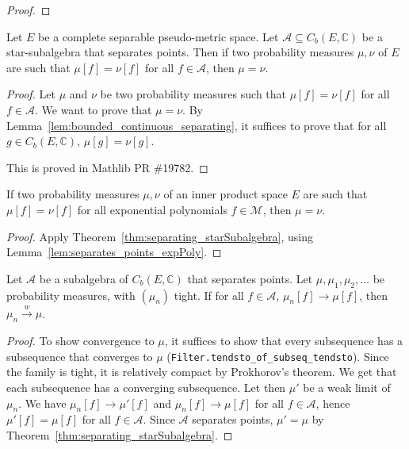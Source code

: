 \begin{proof}\leanok
{}
\end{proof}


\begin{theorem}\label{thm:separating_starSubalgebra}
\mathlibok
{}
Let $E$ be a complete separable pseudo-metric space. Let $\mathcal A \subseteq C_b(E, \mathbb{C})$ be a star-subalgebra that separates points.
Then if two probability measures $\mu, \nu$ of $E$ are such that $\mu[f] = \nu[f]$ for all $f \in \mathcal A$, then $\mu = \nu$.
\end{theorem}

\begin{proof}
\leanok
Let $\mu$ and $\nu$ be two probability measures such that $\mu[f] = \nu[f]$ for all $f \in \mathcal A$. We want to prove that $\mu = \nu$.
By Lemma~\ref{lem:bounded_continuous_separating}, it suffices to prove that for all $g \in C_b(E, \mathbb{C})$, $\mu[g] = \nu[g]$.

This is proved in Mathlib PR \#19782.
\end{proof}


\begin{lemma}\label{lem:separating_expPoly}
If two probability measures $\mu, \nu$ of an inner product space $E$ are such that $\mu[f] = \nu[f]$ for all exponential polynomials $f \in \mathcal M$, then $\mu = \nu$.
\end{lemma}

\begin{proof}
Apply Theorem~\ref{thm:separating_starSubalgebra}, using Lemma~\ref{lem:separates_points_expPoly}.
\end{proof}


\begin{lemma}\label{lem:cvg_of_separating}
\leanok
{}
Let $\mathcal A$ be a subalgebra of $C_b(E, \mathbb{C})$ that separates points. Let $\mu, \mu_1, \mu_2, \ldots$ be probability measures, with $(\mu_n)$ tight. If for all $f \in \mathcal A$, $\mu_n[f] \to \mu[f]$, then $\mu_n \xrightarrow{w} \mu$.
\end{lemma}

\begin{proof}
\leanok
To show convergence to $\mu$, it suffices to show that every subsequence has a subsequence that converges to $\mu$ (\texttt{Filter.tendsto\_of\_subseq\_tendsto}).
Since the family is tight, it is relatively compact by Prokhorov's theorem. We get that each subsequence has a converging subsequence.
Let then $\mu'$ be a weak limit of $\mu_n$. We have $\mu_n[f] \to \mu'[f]$ and $\mu_n[f] \to \mu[f]$ for all $f \in \mathcal A$, hence $\mu'[f] = \mu[f]$ for all $f \in \mathcal A$. Since $\mathcal A$ separates points, $\mathcal \mu' = \mu$ by Theorem~\ref{thm:separating_starSubalgebra}.
\end{proof}
